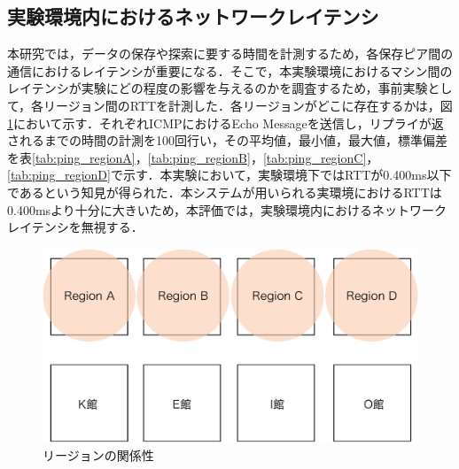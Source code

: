\subsection{実験環境内におけるネットワークレイテンシ}
本研究では，データの保存や探索に要する時間を計測するため，各保存ピア間の通信におけるレイテンシが重要になる．そこで，本実験環境におけるマシン間のレイテンシが実験にどの程度の影響を与えるのかを調査するため，事前実験として，各リージョン間のRTTを計測した．各リージョンがどこに存在するかは，図\ref{fig:region}において示す．それぞれICMPにおけるEcho Messageを送信し，リプライが返されるまでの時間の計測を100回行い，その平均値，最小値，最大値，標準偏差を表\ref{tab:ping_regionA}，\ref{tab:ping_regionB}，\ref{tab:ping_regionC}，\ref{tab:ping_regionD}で示す．本実験において，実験環境下ではRTTが0.400ms以下であるという知見が得られた．本システムが用いられる実環境におけるRTTは0.400msより十分に大きいため，本評価では，実験環境内におけるネットワークレイテンシを無視する．


 \begin{figure}[htbp]
  \begin{center}
   \includegraphics[width=140mm]{./images/region.eps}
  \end{center}
  \caption{リージョンの関係性}
  \label{fig:region}
\end{figure}


